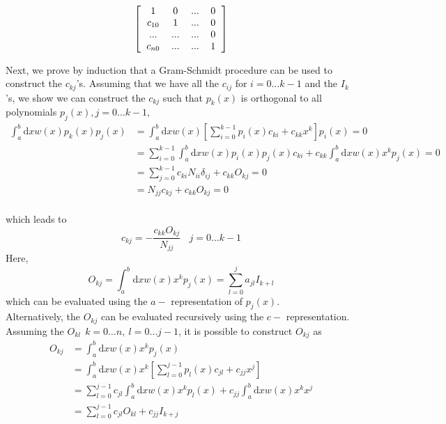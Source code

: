 \documentclass[paper=a4, fontsize=11pt]{article} %
\numberwithin{equation}{section} %
\numberwithin{figure}{section} %
\numberwithin{table}{section} %
\newcommand{\rd}{{\mathrm{d}}}
\begin{document}
\[ 
\left [
  \begin{tabular}{cccc}
  $1$ & $0$ & ... & $0$ \\
  $c_{10}$ & 1 & ... & $0$ \\
  ... & ... & ... & $0$\\
  $c_{n0}$ & ... & ... & $1$\\
  \end{tabular}
\right ]
\]

Next, we prove by induction that a Gram-Schmidt procedure can be used to construct the $c_{kj}$'s. Assuming that we have all the $c_{ij}$ for $i = 0\ldots k-1$ and the $I_{k}$'s, we show we can construct the $c_{kj}$ such that $p_k(x)$ is orthogonal to all polynomials $p_j(x), j = 0\ldots k-1$,
\begin{equation}
\begin{split}
\int_a^b \rd x w(x) p_k(x) p_j(x) 
&= \int_a^b \rd x w(x) \left[\sum_{i=0}^{k-1} p_{i}(x) c_{ki} + c_{kk} x^k\right] p_i(x) =0 \\
&= \sum_{i=0}^{k-1} \int_a^b \rd x w(x) p_{i}(x) p_j(x) c_{ki} + c_{kk}\int_a^b \rd x w(x) x^k p_j(x)=0 \\
&= \sum_{j=0}^{k-1} c_{ki} N_{ii} \delta_{ij} + c_{kk} O_{kj}=0\\
&= N_{jj} c_{kj} + c_{kk} O_{kj}=0\\
\end{split}
\end{equation}

which leads to
\begin{equation}
c_{kj} = -\frac{c_{kk} O_{kj}}{N_{jj}}\ \ \ \
j = 0\ldots k-1
\end{equation}
Here,
\begin{equation} 
O_{kj} = \int_a^b \rd x w(x) x^k p_j(x) = \sum_{l=0}^j a_{jl} I_{k+l}
\end{equation}
which can be evaluated using the $a-$ representation of $p_j(x)$. \\

Alternatively, the $O_{kj}$ can be evaluated recursively using the $c-$ representation. Assuming the $O_{kl}\ \ k = 0 \ldots n, \ l = 0 \ldots j-1$, it is possible to construct $O_{kj}$ as
\begin{equation}
\begin{split}
O_{kj} &= \int_a^b \rd x w(x) x^k p_j(x) \\
&= \int_a^b \rd x w(x) x^k  \left[\sum_{l=0}^{j-1} p_{l}(x) c_{jl} + c_{jj} x^j\right]\\
&= \sum_{l=0}^{j-1} c_{jl} \int_a^b \rd x w(x) x^k p_{l}(x) + c_{jj}\int_a^b \rd x w(x) x^k x^j \\
&= \sum_{l=0}^{j-1} c_{jl}O_{kl} + c_{jj} I_{k+j}
\end{split}
\end{equation}
\end{document}
